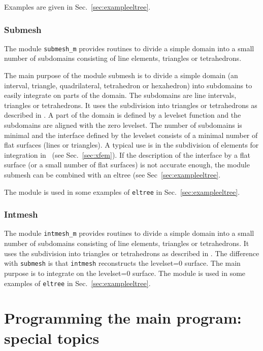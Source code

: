 Examples are given in Sec.~\ref{sec:exampleeltree}.

\subsubsection{Submesh}
\label{sec:submesh}

The module \texttt{submesh\_m} provides routines to divide a simple
domain into a small number of subdomains consisting
of line elements, triangles or tetrahedrons. 

The main purpose of the module submesh is to divide a simple domain (an
interval, triangle, quadrilateral, tetrahedron or hexahedron) into
subdomains to easily integrate on
parts of the domain. The subdomains are line intervals, triangles or
tetrahedrons.
It uses the subdivision into triangles or tetrahedrons
as described in \cite{Min07}.
A part of the domain is defined by a levelset function and
the subdomains are aligned with the zero levelset.
The number of subdomains is minimal and the interface defined by the
levelset consists of a minimal number of flat surfaces (lines or triangles).
A typical use is in the subdivision of elements for integration in \xfem\ (see
Sec.~\ref{sec:xfem}). If the description of the interface by a flat surface
(or a small number of flat surfaces) is not accurate enough, the module submesh
can be combined with an eltree (see Sec~\ref{sec:exampleeltree}. 

The module is used in some
examples of \texttt{eltree} in Sec.~\ref{sec:exampleeltree}.

\subsubsection{Intmesh}
\label{sec:intmesh}

The module \texttt{intmesh\_m} provides routines to divide a simple
domain into a small number of subdomains consisting
of line elements, triangles or tetrahedrons. It uses the subdivision into triangles or tetrahedrons
as described in \cite{Min07}. The difference with \texttt{submesh} is that
\texttt{intmesh} reconstructs the levelset=0 surface.
The main purpose is to integrate on the levelset=0 surface.
The module is used in some
examples of \texttt{eltree} in Sec.~\ref{sec:exampleeltree}.

\newpage
\section{Programming the main program: special topics}

